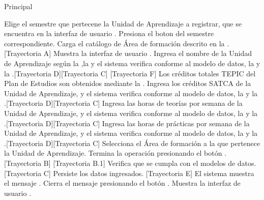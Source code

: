 \begin{UCtrayectoria}{Principal}

    \UCpaso[\UCactor] Elige el semestre que pertecene la Unidad de Aprendizaje a registrar, que se encuentra en la interfaz de usuario .
    \UCpaso[\UCactor] Presiona el boton \IUbutton{+} del semestre correspondiente.
    \UCpaso Carga el catálogo de Área de formación descrito en la .[Trayectoria A]
    \UCpaso Muestra la interfaz de usuario .
    \UCpaso[\UCactor] Ingresa el nombre de la Unidad de Aprendizaje según la ,la  y el sistema verifica conforme al modelo de datos, la  y la .[Trayectoria D][Trayectoria C] [Trayectoria F]
    \UCpaso Los créditos totales TEPIC del Plan de Estudios son obtenidos mediante la .
    \UCpaso[\UCactor] Ingresa los créditos SATCA de la Unidad de Aprendizaje, y el sistema verifica conforme al modelo de datos, la  y la .[Trayectoria D][Trayectoria C]
    \UCpaso[\UCactor] Ingresa las horas de teorías por semana de la Unidad de Aprendizaje, y el sistema verifica conforme al modelo de datos, la  y la .[Trayectoria D][Trayectoria C]
    \UCpaso[\UCactor] Ingresa las horas de prácticas por semana de la Unidad de Aprendizaje, y el sistema verifica conforme al modelo de datos, la  y la .[Trayectoria D][Trayectoria C]
    \UCpaso[\UCactor] Selecciona el Área de formación a la que pertenece la Unidad de Aprendizaje.
    \UCpaso[\UCactor] Termina la operación presionando el botón . [Trayectoria B] [Trayectoria B.1]
    \UCpaso Verifica que se cumpla con el modelos de datos. [Trayectoria C]
    \UCpaso Persiste los datos ingresados. [Trayectoria E]
    \UCpaso El sistema muestra el mensaje .
    \UCpaso[\UCactor] Cierra el mensaje presionando el botón .
    \UCpaso Muestra la interfaz de usuario  .
\end{UCtrayectoria}


